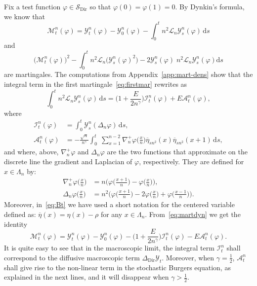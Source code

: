 \documentclass[AHL,Unicode,longabstracts]{cedram}
\DeclareMathOperator{\Dir}{Dir}
\newcommand{\mc}[1]{{\mathcal #1}}
\renewcommand{\mc}[1]{{\mathcal #1}}
\renewcommand{\bar}{\overline}
\newcommand*{\dd}{\mathrm{d}}
\newcommand*{\ds}{\dd s}
\begin{document}
Fix a test function $\varphi\in\mc S_{\Dir}$ so that $\varphi(0)=\varphi(1)=0$. By Dynkin's formula, we know that
\begin{equation}\label{eq:firstmar}
\mathcal{M}_t^n(\varphi)=\mathcal{Y}_t^n(\varphi)-\mathcal{Y}_0^n(\varphi)-\int_0^t n^2\mathcal{L}_n \mathcal{Y}_s^n(\varphi)\, \ds
\end{equation}
and
\begin{equation}
\big(\mc M_t^n(\varphi)\big)^2 - \int_0^t n^2\mc L_n \big(\mc Y^n_s(\varphi)^2\big)-2\mc Y^n_s(\varphi)\; n^2\mc L_n \mc Y^n_s(\varphi) \ds \label{eq:secondmar}
\end{equation}
are martingales. The computations from Appendix~\ref{app:mart-dens} show that the integral term in the first martingale~\eqref{eq:firstmar} rewrites as
\begin{equation}\label{eq:martdyn}
\int_0^t n^2 \mc L_n\mc Y_s^n(\varphi)\,\ds = \Big(1+\frac{E}{2n^\gamma}\Big)\mc I_t^n(\varphi) + E\mc A_t^n(\varphi),
\end{equation}
where
\begin{align}
\mc I_t^n(\varphi)&= \int_0^t \mc Y_s^n(\Delta_n \varphi) \,\ds, \label{eq:I}
\\
\mc A_t^n(\varphi)&= - \frac{\sqrt n}{n^\gamma}\int_0^t\; \sum_{x=1}^{n-2} \nabla_n^+\varphi\Big(\frac{x}{n}\Big) \bar\eta_{sn^2}(x)\bar\eta_{sn^2}(x+1) \,\ds, \label{eq:Bt}
\end{align}
and where, above, $\nabla_n^+ \varphi$ and $\Delta_n \varphi$ are the two functions that approximate on the discrete line the gradient and Laplacian of $\varphi$, respectively. They are defined for $x \in \Lambda_n$ by:
\begin{align*}
\nabla_n^+ \varphi\Big(\frac{x}{n}\Big) & = n\Big(\varphi\Big(\frac{x+1}{n}\Big)-\varphi\Big(\frac{x}{n}\Big)\Big), \\
\Delta_n\varphi\Big(\frac{x}{n}\Big) & =n^2\Big(\varphi\Big(\frac{x+1}{n}\Big)-2\varphi\Big(\frac{x}{n}\Big) + \varphi\Big(\frac{x-1}{n}\Big)\Big).
\end{align*}
Moreover, in~\eqref{eq:Bt} we have used a short notation for the centered variable defined as: $\bar \eta(x)=\eta(x)-\rho$ for any $x\in\Lambda_n$. From~\eqref{eq:martdyn} we get the identity
\begin{equation}\label{mart_decomp}
\mathcal{M}_t^n(\varphi)=\mathcal{Y}_t^n(\varphi)-\mathcal{Y}_0^n(\varphi)-\Big(1+\frac{E}{2n^\gamma}\Big)\mc I_t^n(\varphi) - E\mc A_t^n(\varphi).
\end{equation}
It is quite easy to see that in the macroscopic limit, the integral term $\mc I_t^n$ shall correspond to the diffusive macroscopic term $\Delta_{\Dir} \mc Y_t$. Moreover, when $\gamma=\frac12$, $\mc A_t^n$ shall give rise to the non-linear term in the stochastic Burgers equation, as explained in the next lines, and it will disappear when $\gamma > \frac12$.
\end{document}

